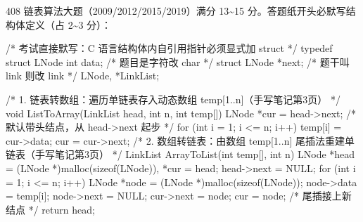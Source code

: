 \documentclass[10pt,a4paper]{ctexart}
\begin{document}

408 链表算法大题（2009/2012/2015/2019）满分 13\textasciitilde{}15 分。答题纸开头必默写结构体定义（占 2\textasciitilde{}3 分）：

\begin{codebox}
/* 考试直接默写：C 语言结构体内自引用指针必须显式加 struct */
typedef struct LNode {
    int data;                    /* 题目是字符改 char */
    struct LNode *next;          /* 题干叫 link 则改 link */
} LNode, *LinkList;
\end{codebox}




\par\addvspace{3pt}\par\addvspace{3pt}


\begin{codebox}
/* 1. 链表转数组：遍历单链表存入动态数组 temp[1..n]（手写笔记第3页） */
void ListToArray(LinkList head, int n, int temp[]) {
    LNode *cur = head->next;            /* 默认带头结点，从 head->next 起步 */
    for (int i = 1; i <= n; i++) { temp[i] = cur->data; cur = cur->next; }
}
/* 2. 数组转链表：由数组 temp[1..n] 尾插法重建单链表（手写笔记第3页） */
LinkList ArrayToList(int temp[], int n) {
    LNode *head = (LNode *)malloc(sizeof(LNode)), *cur = head;
    head->next = NULL;
    for (int i = 1; i <= n; i++) {
        LNode *node = (LNode *)malloc(sizeof(LNode));
        node->data = temp[i]; node->next = NULL;
        cur->next = node; cur = node;   /* 尾插接上新结点 */
    }
    return head;
}
\end{codebox}

\par\addvspace{3pt}\par\addvspace{3pt}
\end{document}
